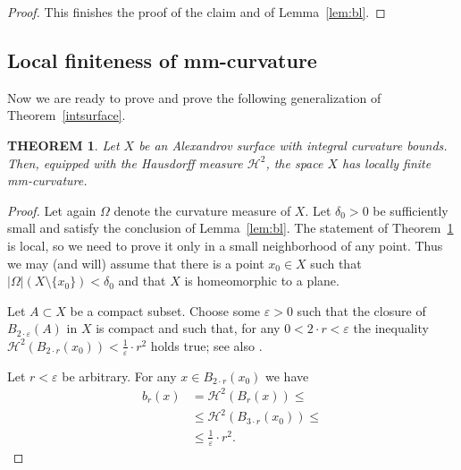 \documentclass[12pt,leqno,intlimits]{amsart}
\numberwithin{equation}{section}
\newtheorem{thm}{THEOREM}[section]
\theoremstyle{definition}
\theoremstyle{remark}
\newcommand{\tref}[1]{Theorem~\ref{#1}}
\newcommand{\lref}[1]{Lemma~\ref{#1}}
\begin{document}
\begin{proof}
This finishes the proof of the claim and of \lref{lem:bl}.
\end{proof}

\subsection{Local finiteness of mm-curvature}
Now we are ready to prove and prove the following generalization of \tref{intsurface}.

\begin{thm}\label{intsurface1}
Let $X$ be an Alexandrov surface with integral curvature bounds. Then, equipped with the Hausdorff measure $\mathcal H^2$, the space $X$ has locally finite mm-curvature.
\end{thm}
%
\begin{proof}
Let again $\Omega$ denote the curvature measure of $X$. Let $\delta _0>0$ be sufficiently small and satisfy the conclusion of \lref{lem:bl}.
The statement of \tref{intsurface1} is local, so we need to prove it only in a small neighborhood of any point.
Thus we may (and will) assume that there is a point $x_0\in X$
such that $| \Omega| (X \setminus \{ x_0 \}) < \delta _0$ and that $X$ is homeomorphic to a plane.

Let $A\subset X$ be a compact subset. Choose some $\varepsilon >0$ such that the closure of $B_{2{\cdot}\varepsilon} (A)$ in $X$ is compact and such that,
for any $0<2{\cdot}r<\varepsilon$ the inequality $\mathcal H^2 (B_{2{\cdot}r}(x_0)) < \tfrac 1 {\varepsilon}\cdot r^2$ holds true; see also \cite[Lemma 8.1.1]{Reshetnyak-GeomIV}.

Let $r<\varepsilon$ be arbitrary.
For any $x\in B_{2{\cdot}r} (x_0)$ we have 
\begin{align*}
b_r (x) &=\mathcal H^2 (B_r (x)) \leq
\\
&\leq \mathcal H^2 (B_{3{\cdot}r} (x_0)) \leq
\\
&\leq \tfrac 1 {\varepsilon}\cdot r^2.
\end{align*}



\end{proof}
\end{document}
